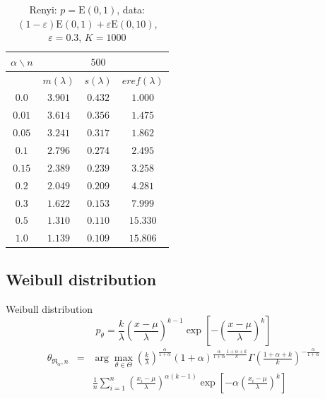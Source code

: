 \documentclass[11pt,a4paper]{beamer}
\newcommand{\amtiT}{\arg \max_{\theta \in \Theta}}
\newcommand{\fa}{\frac{\alpha}{1+\alpha}}
\begin{document}
\begin{frame}
\begin{table}[ht] \footnotesize
\begin{center} 
\begin{tabular}{|c|ccc|} 
\hline 
$\alpha\backslash n$ && $500$ & \\ 
\hline 
& $m(\lambda)$ & $s(\lambda)$ & $eref(\lambda)$ \\ 
\hline 
$0.0$ & $ 3.901 $ & $ 0.432 $ & $ 1.000 $\\ 
\hline 
$0.01$ &$ 3.614 $ & $ 0.356 $ & $ 1.475 $\\ 
\hline 
$0.05$ & $ 3.241 $ & $ 0.317 $ & $ 1.862 $\\ 
\hline 
$0.1$ & $ 2.796 $ & $ 0.274 $ & $ 2.495 $\\ 
\hline 
$0.15$ & $ 2.389 $ & $ 0.239 $ & $ 3.258 $\\ 
\hline 
$0.2$ &$ 2.049 $ & $ 0.209 $ & $ 4.281 $\\ 
\hline 
$0.3$ & $ 1.622 $ & $ 0.153 $ & $ 7.999 $\\ 
\hline 
$0.5$ &  $ 1.310 $ & $ 0.110 $ & $ 15.330 $\\ 
\hline 
$1.0$ &  $ 1.139 $ & $ 0.109 $ & $ 15.806 $\\ 
\hline 
\end{tabular}
\caption{Renyi: $p = \mathrm{E}(0,1)$, data: $(1-\varepsilon)\mathrm{E}(0,1) + \varepsilon \mathrm{E}(0,10)$, $\varepsilon =  0.3$, $K = 1000$} 
\end{center}
\end{table}
\end{frame}

\subsection{Weibull distribution}
\begin{frame}{Weibull distribution} %
	\begin{equation*}
		p_\theta =  \frac{k}{\lambda} \left( \frac{x-\mu}{\lambda} \right)^{k-1} \exp \left[ -\left( \frac{x-\mu}{\lambda} \right)^k \right] 
	\end{equation*}
	\begin{eqnarray}
		\theta_{\mathfrak{R}_\alpha,n} & = & \amtiT \left( \frac{k}{\lambda} \right)^\fa (1+\alpha)^{\fa\frac{1+\alpha+k}{k}} \Gamma\left(\frac{1+\alpha+k}{k}\right)^{-\fa} \nonumber \\
							&& \frac{1}{n}\sum_{i=1}^n \left( \frac{x_i-\mu}{\lambda}\right)^{\alpha(k-1)} \exp\left[-\alpha \left(\frac{x_i-\mu}{\lambda}\right)^k\right] \nonumber
	\end{eqnarray}
\end{frame}
\end{document}
